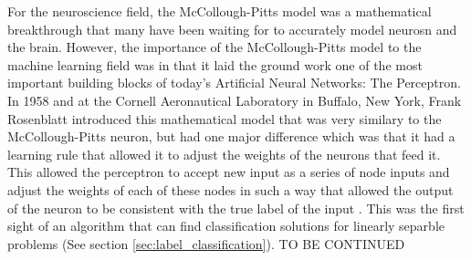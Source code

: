 For the neuroscience field, the McCollough-Pitts model was a mathematical breakthrough that many have been waiting for to accurately model neurosn and the brain. However, the importance of the McCollough-Pitts model to the machine learning field was in that it laid the ground work one of the most important building blocks of today's Artificial Neural Networks: The Perceptron. In 1958 and at the Cornell Aeronautical Laboratory in Buffalo, New York, Frank Rosenblatt introduced this mathematical model that was very similary to the McCollough-Pitts neuron, but had one major difference which was that it had a learning rule that allowed it to adjust the weights of the neurons that feed it. This allowed the perceptron to accept new input as a series of node inputs and adjust the weights of each of these nodes in such a way that allowed the output of the neuron to be consistent with the true label of the input \cite{someSpecificANN}. This was the first sight of an algorithm that can find classification solutions for linearly separble problems (See section \ref{sec:label_classification}). TO BE CONTINUED


